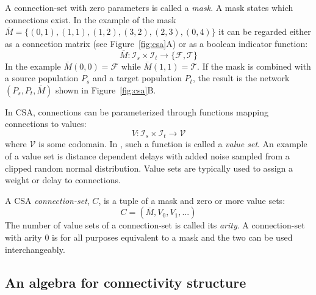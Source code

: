 \documentclass{frontiersSCNS} %
\newcommand{\Figure}[2]{Figure~\ref{#2}}
\newcommand{\Figure}[2]{Figure~#1}
\begin{document}
A connection-set with zero parameters is called a \emph{mask}. A mask
states which connections exist.  In the example of the mask
$\overline{M} = \{(0,1), (1,1), (1,2), (3,2), (2,3), (0,4)\}$ it can
be regarded either as a connection matrix (see \Figure{1}{fig:csa}A)
or as a boolean indicator function:
\begin{equation*}
\overline{M} : \mathcal{I}_s \times \mathcal{I}_t \rightarrow \{ \mathcal{F},
\mathcal{T} \}
\end{equation*}
In the example $\overline{M}(0,0) = \mathcal{F}$ while
$\overline{M}(1,1) = \mathcal{T}$. If the mask is combined with a
source population $P_s$ and a target population $P_t$, the result is
the network $(P_s, P_t, \overline{M})$ shown in \Figure{1}{fig:csa}B.

In CSA, connections can be parameterized through functions mapping
connections to values:
\begin{equation*}
V : \mathcal{I}_s \times \mathcal{I}_t \rightarrow \mathcal{V}
\end{equation*}
where $\mathcal{V}$ is some codomain. In \citet{djurfeldt12}, such a
function is called a \emph{value set}. An example of a value set is
distance dependent delays with added noise sampled from a clipped
random normal distribution. Value sets are typically used to assign a
weight or delay to connections.

A CSA \emph{connection-set}, $C$, is a tuple of a mask and zero or
more value sets:
\begin{equation*}
C = (\overline{M}, V_0, V_1, ...)
\end{equation*}
The number of value sets of a connection-set is called its
\emph{arity}. A connection-set with arity 0 is for all purposes
equivalent to a mask and the two can be used interchangeably.

\subsection{An algebra for connectivity structure}\label{sec:structure}
\end{document}
